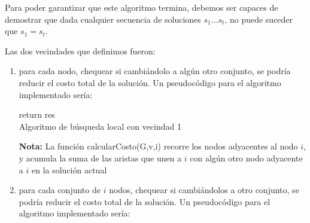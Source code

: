 \documentclass[11pt, a4paper, twoside]{article}
\begin{document}
\begin{enumerate}
\begin{enumerate}
		Para poder garantizar que este algoritmo termina, debemos ser capaces de demostrar que dada
		cualquier secuencia de soluciones $s_{1} \dots s_{t}$, no puede suceder que $s_{1} = s_{t}$.
		
		Las dos vecindades que definimos fueron:
		\begin{enumerate}
			\item para cada nodo, chequear si cambiándolo a algún otro conjunto, se podría reducir el costo
			      total de la solución. Un pseudocódigo para el algoritmo implementado sería:
			      
			      \begin{algorithm}
					  
					  return res \\
					\caption{Algoritmo de búsqueda local con vecindad 1}
					\end{algorithm}
			     \textbf{Nota: } La función calcularCosto(G,v,i) recorre los nodos adyacentes al nodo $i$, y acumula la suma
					            de las aristas que unen a $i$ con algún otro nodo adyacente a $i$ en la solución actual
			     
			\item para cada conjunto de $i$ nodos, chequear si cambiándolos a otro conjunto, se podría reducir el costo
				  total de la solución. Un pseudocódigo para el algoritmo implementado sería:
				  
				  \begin{algorithm}
					\SetKwInOut{Input}{input}
					\SetKwInOut{Output}{output}
					  \Input{}
					  \Output{}
					  

\end{algorithm}
\end{enumerate}
\end{enumerate}
\end{enumerate}
\end{document}
